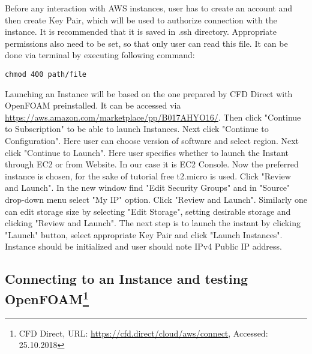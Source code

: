 \documentclass[11pt,english]{article}
\begin{document}
Before any interaction with AWS instances, user has to create an account and then create Key Pair, which will be used to authorize connection with the instance. It is recommended that it is saved in .ssh directory. Appropriate permissions also need to be set, so that only user can read this file. It can be done via terminal by executing following command:
\begin{lstlisting}
chmod 400 path/file
\end{lstlisting}
Launching an Instance will be based on the one prepared by CFD Direct with OpenFOAM preinstalled. It can be accessed via \url{https://aws.amazon.com/marketplace/pp/B017AHYO16/}. Then click "Continue to Subscription" to be able to launch Instances. Next click "Continue to Configuration". Here user can choose version of software and select region. Next click "Continue to Launch".
Here user specifies whether to launch the Instant through EC2 or from Website. In our case it is EC2 Console. Now the preferred instance is chosen, for the sake of tutorial free t2.micro is used. Click "Review and Launch". In the new window find "Edit Security Groups" and in "Source" drop-down menu select "My IP" option. Click "Review and Launch". Similarly one can edit storage size by selecting "Edit Storage", setting desirable storage and clicking "Review and Launch".
The next step is to launch the instant by clicking "Launch" button, select appropriate Key Pair and click "Launch Instances". Instance should be initialized and user should note IPv4 Public IP address.

\subsection{\texorpdfstring{Connecting to an Instance and testing OpenFOAM\footnote{CFD Direct, URL: \url{https://cfd.direct/cloud/aws/connect}, Accessed: 25.10.2018}}{Connecting to an Instance and testing OpenFOAM}}
\end{document}
